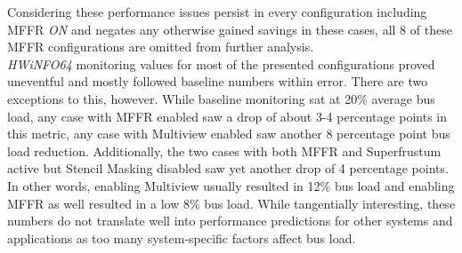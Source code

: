 Considering these performance issues persist in every configuration including \gls{MFFR} \textit{ON} and negates any otherwise gained savings in these cases, all 8 of these MFFR configurations are omitted from further analysis. \\
\textit{HWiNFO64} monitoring values for most of the presented configurations proved uneventful and mostly followed baseline numbers within error. There are two exceptions to this, however. While baseline monitoring sat at 20\% average bus load, any case with \gls{MFFR} enabled saw a drop of about 3-4 percentage points in this metric, any case with Multiview enabled saw another 8 percentage point bus load reduction. Additionally, the two cases with both \gls{MFFR} and Superfrustum active but Stencil Masking disabled saw yet another drop of 4 percentage points. In other words, enabling Multiview usually resulted in 12\% bus load and enabling \gls{MFFR} as well resulted in a low 8\% bus load. While tangentially interesting, these numbers do not translate well into performance predictions for other systems and applications as too many system-specific factors affect bus load. 

